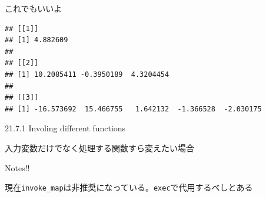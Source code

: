 \documentclass[ignorenonframetext,]{beamer}
\newenvironment{Shaded}{\begin{snugshade}}{\end{snugshade}}
\newcommand{\KeywordTok}[1]{\textcolor[rgb]{0.13,0.29,0.53}{\textbf{#1}}}
\newcommand{\DecValTok}[1]{\textcolor[rgb]{0.00,0.00,0.81}{#1}}
\newcommand{\StringTok}[1]{\textcolor[rgb]{0.31,0.60,0.02}{#1}}
\newcommand{\OperatorTok}[1]{\textcolor[rgb]{0.81,0.36,0.00}{\textbf{#1}}}
\newcommand{\NormalTok}[1]{#1}
\begin{document}
\begin{frame}[fragile]{これでもいいよ}

\begin{Shaded}
\end{Shaded}

\begin{verbatim}
## [[1]]
## [1] 4.882609
## 
## [[2]]
## [1] 10.2085411 -0.3950189  4.3204454
## 
## [[3]]
## [1] -16.573692  15.466755   1.642132  -1.366528  -2.030175
\end{verbatim}

\end{frame}

\begin{frame}[fragile]{21.7.1 Involing different functions}

入力変数だけでなく処理する関数すら変えたい場合

\begin{block}{Notes!!}

現在\texttt{invoke\_map}は非推奨になっている。\texttt{exec}で代用するべしとある

\end{block}

\end{frame}
\end{document}
